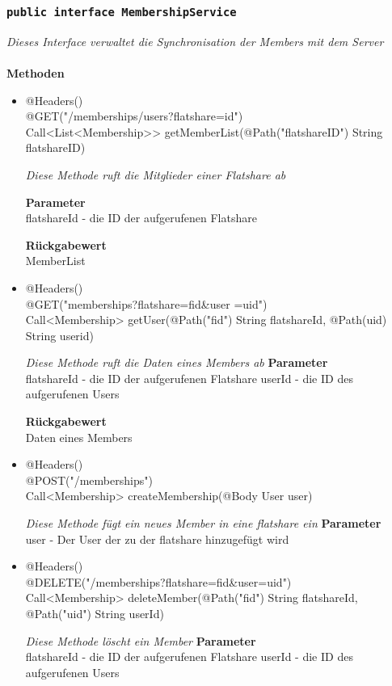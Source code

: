 	\subsubsection{\texttt{public interface  MembershipService }}
\textit{Dieses Interface verwaltet die Synchronisation der Members mit dem Server}\\
\\
	\textbf{Methoden} \\
		\begin{itemize}
		\item{@Headers()\\ @GET("/memberships/users?flatshare={id}") \\ Call<List<Membership>> getMemberList(@Path("flatshareID") String flatshareID)}

		\textit{Diese Methode ruft die Mitglieder einer Flatshare ab}

		\textbf{Parameter} \\
	flatshareId - die ID der aufgerufenen Flatshare  

		\textbf{Rückgabewert} \\
	MemberList

      \item{@Headers()\\ @GET("memberships?flatshare={fid}\&user ={uid}")\\Call<Membership> getUser(@Path("fid") String flatshareId, @Path(\grqq uid\grqq) String userid)}

		\textit{Diese Methode ruft die Daten eines Members ab}        	
		\textbf{Parameter} \\
		flatshareId - die ID der aufgerufenen Flatshare 
	userId - die ID des aufgerufenen Users

		\textbf{Rückgabewert} \\
      Daten eines Members


      \item{@Headers()\\ @POST("/memberships")\\ Call<Membership> createMembership(@Body User user)}

		\textit{Diese Methode fügt ein neues Member in eine flatshare ein}        	
		\textbf{Parameter} \\
		user - Der User der zu der flatshare hinzugefügt wird 

	      \item{@Headers()\\ @DELETE("/memberships?flatshare={fid}\&user={uid}")\\Call<Membership> deleteMember(@Path("fid") String flatshareId, @Path("uid") String userId)}

		\textit{Diese Methode löscht ein Member}        	
		\textbf{Parameter} \\
		flatshareId - die ID der aufgerufenen Flatshare 
	userId - die ID des aufgerufenen Users


	 \end{itemize}

